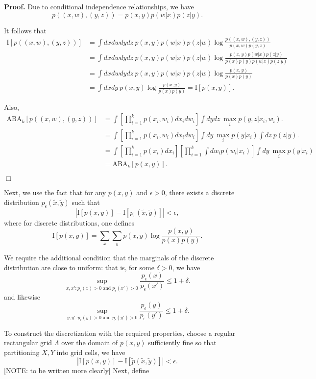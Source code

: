 \documentclass[12pt]{article}
\begin{document}
\textbf{Proof.}
Due to conditional independence relationships, we have
\[
p((x,w), (y,z)) = p(x,y)p(w|x)p(z|y).
\]

It follows that
\begin{align*}
\text{I}[p((x,w), (y,z))] &= \int dx dw dy dz  \ p(x,y)p(w|x)p(z|w) \log \frac{p((x,w), (y,z))}{p(x,w)p(y,z)}
\\&= \int dx dw dy dz \ p(x,y)p(w|x)p(z|w) \log \frac{p(x, y)p(w|x)p(z|y)}{p(x)p(y)p(w|x)p(z|y)}
\\&= \int dx dw dy dz \ p(x,y)p(w|x)p(z|w) \log \frac{p(x, y)}{p(x)p(y)}
\\&= \int dx dy \ p(x,y) \log \frac{p(x, y)}{p(x)p(y)} = \text{I}[p(x,y)].
\end{align*}

Also,
\begin{align*}
\text{ABA}_k[p((x,w),(y,z))] 
&= \int \left[\prod_{i=1}^k p(x_i, w_i) dx_i dw_i \right] \int dy dz \ \max_i p(y,z|x_i, w_i).
\\&= \int \left[\prod_{i=1}^k p(x_i, w_i) dx_i dw_i \right] \int dy \ \max_i p(y|x_i) \int dz \ p(z|y).
\\&= \int \left[\prod_{i=1}^k p(x_i) dx_i \right] \left[\prod_{i=1}^k \int dw_i p(w_i|x_i)\right] \int dy \ \max_i p(y|x_i)
\\&= \text{ABA}_k[p(x,y)].
\end{align*}

$\Box$

Next, we use the fact that for any $p(x,y)$ and $\epsilon > 0$, there exists a discrete distribution $p_\epsilon(\tilde{x}, \tilde{y})$ such that
\[
|\text{I}[p(x,y)] - \text{I}[p_\epsilon(\tilde{x}, \tilde{y})]| < \epsilon,
\]
where for discrete distributions, one defines
\[
\text{I}[p(x,y)] = \sum_x \sum_y p(x,y) \log \frac{p(x,y)}{p(x)p(y)}.
\]

We require the additional condition that the marginals of the discrete distribution are close to uniform: that is, for some $\delta > 0$, we have
\[
\sup_{x, x': p_\epsilon(x) > 0\text{ and }p_\epsilon(x') > 0} \frac{p_\epsilon(x)}{p_\epsilon(x')} \leq 1 + \delta.
\]
and likewise
\[
\sup_{y, y': p_\epsilon(y) > 0\text{ and }p_\epsilon(y') > 0} \frac{p_\epsilon(y)}{p_\epsilon(y')} \leq 1 + \delta.
\]

To construct the discretization with the required properties, choose a regular rectangular grid $\Lambda$ over the domain of $p(x,y)$
sufficiently fine so that partitioning $X,Y$ into grid cells, we have
\[
|\text{I}[p(x,y)] - \text{I}[\tilde{p}(\tilde{x}, \tilde{y})]| < \epsilon.
\]
[NOTE: to be written more clearly]
Next, define 
\end{document}
